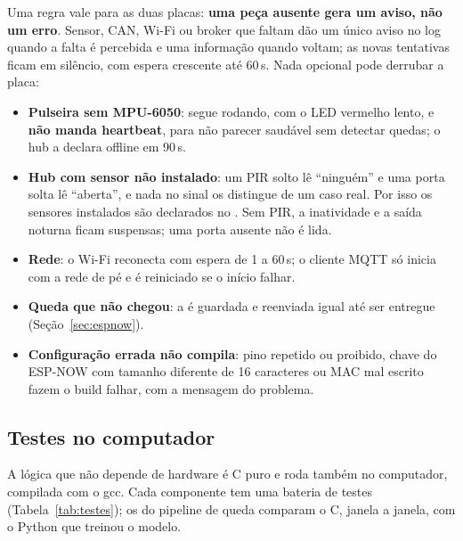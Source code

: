 Uma regra vale para as duas placas: \textbf{uma peça ausente gera um aviso, não um erro}.
Sensor, CAN, Wi-Fi ou broker que faltam dão um único aviso no log quando a falta é percebida e
uma informação quando voltam; as novas tentativas ficam em silêncio, com espera crescente até
60\,s. Nada opcional pode derrubar a placa:
\begin{itemize}
  \item \textbf{Pulseira sem MPU-6050}: segue rodando, com o LED vermelho lento, e \textbf{não
        manda heartbeat}, para não parecer saudável sem detectar quedas; o hub a declara
        offline em 90\,s.
  \item \textbf{Hub com sensor não instalado}: um PIR solto lê ``ninguém'' e uma porta solta
        lê ``aberta'', e nada no sinal os distingue de um caso real. Por isso os sensores
        instalados são declarados no . Sem PIR, a inatividade e a saída
        noturna ficam suspensas; uma porta ausente não é lida.
  \item \textbf{Rede}: o Wi-Fi reconecta com espera de 1 a 60\,s; o cliente MQTT só inicia
        com a rede de pé e é reiniciado se o início falhar.
  \item \textbf{Queda que não chegou}: a  é guardada e reenviada igual até ser
        entregue (Seção~\ref{sec:espnow}).
  \item \textbf{Configuração errada não compila}: pino repetido ou proibido, chave do ESP-NOW
        com tamanho diferente de 16 caracteres ou MAC mal escrito fazem o build falhar, com a
        mensagem do problema.
\end{itemize}

\subsection{Testes no computador}

A lógica que não depende de hardware é C puro e roda também no computador, compilada com o
gcc. Cada componente tem uma bateria de testes (Tabela~\ref{tab:testes}); os do pipeline de
queda comparam o C, janela a janela, com o Python que treinou o modelo.

